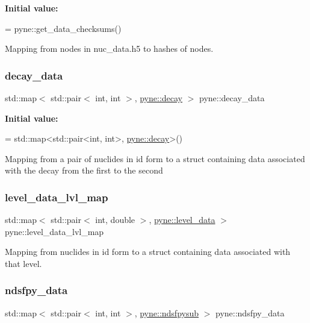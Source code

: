{\bfseries Initial value\+:}
\begin{DoxyCode}
=
  pyne::get\_data\_checksums()
\end{DoxyCode}


Mapping from nodes in nuc\+\_\+data.\+h5 to hashes of nodes. 

\mbox{\label{namespacepyne_ac880c3701eca3453cb9cdfab30195d65}} 
\subsubsection{\texorpdfstring{decay\+\_\+data}{decay\_data}}
{\footnotesize\ttfamily std\+::map$<$ std\+::pair$<$ int, int $>$, \hyperlink{structpyne_1_1decay}{pyne\+::decay} $>$ pyne\+::decay\+\_\+data}

{\bfseries Initial value\+:}
\begin{DoxyCode}
= 
  std::map<std::pair<int, int>, \hyperlink{structpyne_1_1decay}{pyne::decay}>()
\end{DoxyCode}
Mapping from a pair of nuclides in id form to a struct containing data associated with the decay from the first to the second \mbox{\label{namespacepyne_aa5b6136e3970959756640b867754bb62}} 
\subsubsection{\texorpdfstring{level\+\_\+data\+\_\+lvl\+\_\+map}{level\_data\_lvl\_map}}
{\footnotesize\ttfamily std\+::map$<$ std\+::pair$<$ int, double $>$, \hyperlink{structpyne_1_1level__data}{pyne\+::level\+\_\+data} $>$ pyne\+::level\+\_\+data\+\_\+lvl\+\_\+map}

Mapping from nuclides in id form to a struct containing data associated with that level. \mbox{\label{namespacepyne_a0526a4bf1637612d760c106836475c6d}} 
\subsubsection{\texorpdfstring{ndsfpy\+\_\+data}{ndsfpy\_data}}
{\footnotesize\ttfamily std\+::map$<$ std\+::pair$<$ int, int $>$, \hyperlink{structpyne_1_1ndsfpysub}{pyne\+::ndsfpysub} $>$ pyne\+::ndsfpy\+\_\+data}

